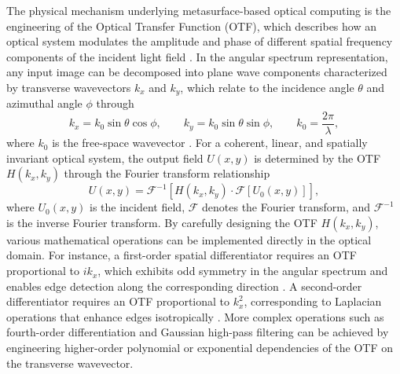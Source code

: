 The physical mechanism underlying metasurface-based optical computing is the engineering of the Optical Transfer Function (OTF), which describes how an optical system modulates the amplitude and phase of different spatial frequency components of the incident light field \cite{goodman2017,wesemann2021review}. In the angular spectrum representation, any input image can be decomposed into plane wave components characterized by transverse wavevectors $k_x$ and $k_y$, which relate to the incidence angle $\theta$ and azimuthal angle $\phi$ through
\[
k_x = k_0 \sin\theta \cos\phi, \qquad
k_y = k_0 \sin\theta \sin\phi, \qquad
k_0 = \frac{2\pi}{\lambda},
\]
where $k_0$ is the free-space wavevector \cite{goodman2017}. For a coherent, linear, and spatially invariant optical system, the output field $U(x,y)$ is determined by the OTF $H(k_x, k_y)$ through the Fourier transform relationship
\[
U(x,y) = \mathcal{F}^{-1}\left[H(k_x, k_y) \cdot \mathcal{F}[U_0(x,y)]\right],
\]
where $U_0(x,y)$ is the incident field, $\mathcal{F}$ denotes the Fourier transform, and $\mathcal{F}^{-1}$ is the inverse Fourier transform. By carefully designing the OTF $H(k_x, k_y)$, various mathematical operations can be implemented directly in the optical domain. For instance, a first-order spatial differentiator requires an OTF proportional to $ik_x$, which exhibits odd symmetry in the angular spectrum and enables edge detection along the corresponding direction \cite{silva2014,bykov2018optica}. A second-order differentiator requires an OTF proportional to $k_x^2$, corresponding to Laplacian operations that enhance edges isotropically \cite{zhu2017,zhou2025laplace}. More complex operations such as fourth-order differentiation \cite{qiu2025highorder} and Gaussian high-pass filtering \cite{zhou2023tailoring} can be achieved by engineering higher-order polynomial or exponential dependencies of the OTF on the transverse wavevector.

